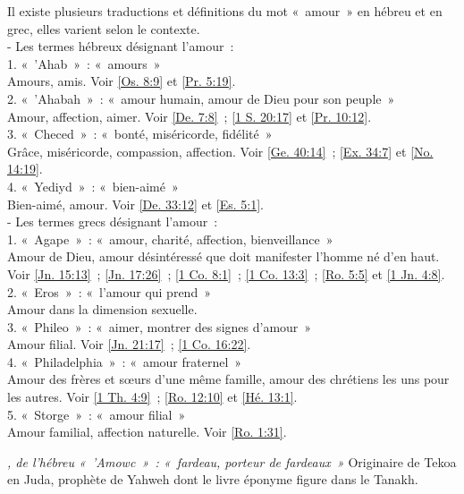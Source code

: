\begin{multicols}{2}
\textit{}\newline
Il existe plusieurs traductions et définitions du mot «~amour~» en hébreu et en grec, elles varient selon le contexte.
\\- Les termes hébreux désignant l'amour~:
\\1. «~'Ahab~»~: «~amours~»
\\Amours, amis. Voir \vref{Os. 8:9} et \vref{Pr. 5:19}.
\\2. «~'Ahabah~»~: «~amour humain, amour de Dieu pour son peuple~»
\\Amour, affection, aimer. Voir \vref{De. 7:8}~; \vref{1 S. 20:17} et \vref{Pr. 10:12}.
\\3. «~Checed~»~: «~bonté, miséricorde, fidélité~»
\\Grâce, miséricorde, compassion, affection. Voir \vref{Ge. 40:14}~; \vref{Ex. 34:7} et \vref{No. 14:19}.
\\4. «~Yediyd~»~: «~bien-aimé~»
\\Bien-aimé, amour. Voir \vref{De. 33:12} et \vref{Es. 5:1}.
\\- Les termes grecs désignant l'amour~:
\\1. «~Agape~»~: «~amour, charité, affection, bienveillance~»
\\Amour de Dieu, amour désintéressé que doit manifester l'homme né d'en haut. Voir \vref{Jn. 15:13}~; \vref{Jn. 17:26}~; \vref{1 Co. 8:1}~; \vref{1 Co. 13:3}~; \vref{Ro. 5:5} et \vref{1 Jn. 4:8}.
\\2. «~Eros~»~: «~l'amour qui prend~»
\\Amour dans la dimension sexuelle.
\\3. «~Phileo~»~: «~aimer, montrer des signes d'amour~»
\\Amour filial. Voir \vref{Jn. 21:17}~; \vref{1 Co. 16:22}.
\\4. «~Philadelphia~»~: «~amour fraternel~»
\\Amour des frères et sœurs d'une même famille, amour des chrétiens les uns pour les autres. Voir \vref{1 Th. 4:9}~; \vref{Ro. 12:10} et \vref{Hé. 13:1}.
\\5. «~Storge~»~: «~amour filial~»
\\Amour familial, affection naturelle. Voir \vref{Ro. 1:31}.

\textit{, de l'hébreu «~'Amowc~»~: «~fardeau, porteur de fardeaux~»}\newline
Originaire de Tekoa en Juda, prophète de Yahweh dont le livre éponyme figure dans le Tanakh.


\end{multicols}
